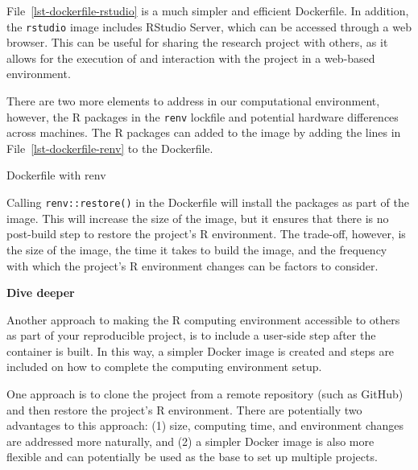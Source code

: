 \documentclass[
  letterpaper,
]{latex/krantz}
\theoremstyle{definition}
\theoremstyle{remark}
\begin{document}
File~\ref{lst-dockerfile-rstudio} is a much simpler and efficient
Dockerfile. In addition, the \texttt{rstudio} image includes RStudio
Server, which can be accessed through a web browser. This can be useful
for sharing the research project with others, as it allows for the
execution of and interaction with the project in a web-based
environment.

There are two more elements to address in our computational environment,
however, the R packages in the \texttt{renv} lockfile and potential
hardware differences across machines. The R packages can added to the
image by adding the lines in File~\ref{lst-dockerfile-renv} to the
Dockerfile.

\begin{codelisting}

\caption{\label{lst-dockerfile-renv}Dockerfile with renv}


\end{codelisting}%

Calling \texttt{renv::restore()} in the Dockerfile will install the
packages as part of the image. This will increase the size of the image,
but it ensures that there is no post-build step to restore the project's
R environment. The trade-off, however, is the size of the image, the
time it takes to build the image, and the frequency with which the
project's R environment changes can be factors to consider.

\begin{tcolorbox}[enhanced jigsaw, breakable, leftrule=.75mm, arc=.35mm, colframe=quarto-callout-color-frame, colback=white, left=2mm, bottomrule=.15mm, rightrule=.15mm, toprule=.15mm, opacityback=0]

\textbf{ Dive deeper}

Another approach to making the R computing environment accessible to
others as part of your reproducible project, is to include a user-side
step after the container is built. In this way, a simpler Docker image
is created and steps are included on how to complete the computing
environment setup.

One approach is to clone the project from a remote repository (such as
GitHub) and then restore the project's R environment. There are
potentially two advantages to this approach: (1) size, computing time,
and environment changes are addressed more naturally, and (2) a simpler
Docker image is also more flexible and can potentially be used as the
base to set up multiple projects.

\end{tcolorbox}
\end{document}
